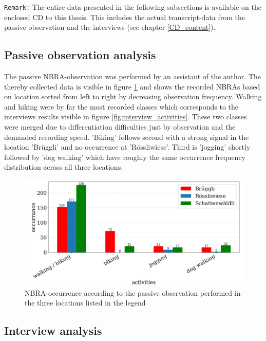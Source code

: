 \texttt{Remark:} The entire data presented in the following subsections is available on the enclosed CD to this thesis. This includes the actual transcript-data from the passive observation and the interviews (see chapter \ref{CD_content}).

\subsection{Passive observation analysis}
The passive NBRA-observation was performed by an assistant of the author. The thereby collected data is visible in figure \ref{fig:passive_observation} and shows the recorded NBRAs based on location sorted from left to right by decreasing observation frequency. Walking and hiking were by far the most recorded classes which corresponds to the interviews results visible in figure \ref{fig:interview_activities}. These two classes were merged due to differentiation difficulties just by observation and the demanded recording speed. 'Biking' follows second with a strong signal in the location 'Br\"uggli' and no occurrence at 'R\"ossliwiese'. Third is 'jogging' shortly followed by 'dog walking' which have roughly the same occurrence frequency distribution across all three locations.

\begin{figure}[h!]
   \centering
   \includegraphics[width=\textwidth]{img/passive_observations.pdf}
   \caption{NBRA-occurrence according to the passive observation performed in the three locations listed in the legend}
   \label{fig:passive_observation}
\end{figure}

\subsection{Interview analysis}

